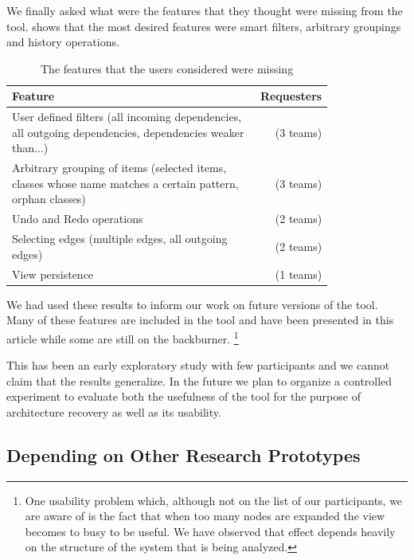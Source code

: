 \documentclass[preprint,12pt]{elsarticle}
\begin{document}
We finally asked what were the features that they thought were missing from the tool.  shows that the most desired features were smart filters, arbitrary groupings and history operations.

\begin{table}[ht]
\begin{center}
\begin{tabular}{p{0.8\linewidth} r}
\footnotesize {Feature} &\footnotesize{ Requesters} \\
\hline
\footnotesize {User defined filters (all incoming dependencies, all outgoing dependencies, dependencies weaker than...)} &\footnotesize{ (3 teams)} \\
\footnotesize {Arbitrary grouping of items (selected items, classes whose name matches a certain pattern, orphan classes)} &\footnotesize{ (3 teams)} \\
\footnotesize {Undo and Redo operations} &\footnotesize{ (2 teams)} \\
\footnotesize {Selecting edges (multiple edges, all outgoing edges)} &\footnotesize{ (2 teams)} \\
\footnotesize {View persistence} &\footnotesize{ (1 teams)} \\
\hline

\end{tabular}
\caption{The features that the users considered were missing}
\label{tab:missing}
\end{center}
\end{table}

We had used these results to inform our work on future versions of the tool. Many of these features are included in the tool and have been presented in this article while some are still on the backburner. \footnote{One usability problem which, although not on the list of our participants, we are aware of is the fact that when too many nodes are expanded the view becomes to busy to be useful. We have observed that effect depends heavily on the structure of the system that is being analyzed. }


This has been an early exploratory study with few participants and we cannot claim that the results generalize. In the future we plan to organize a controlled experiment to evaluate both the usefulness of the tool for the purpose of architecture recovery as well as its usability.

\subsection {Depending on Other Research Prototypes }
\end{document}
